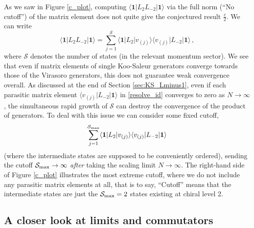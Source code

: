 \documentclass[a4paper,10pt]{article}
\newcommand{\linnea}[1]{$\framebox{\tiny L}$\ \textbf{\texttt{{\color{red}\footnotesize#1}}}}
\newcommand{\jesper}[1]{$\framebox{\tiny J}$\ \textbf{\texttt{{\color{cyan}\footnotesize#1}}}}
\begin{document}
As we saw in Figure \ref{c_plot}, computing $\langle \mathbf{1} | L_2L_{-2}|\mathbf{1}\rangle$ via the full norm (``No cutoff'') of the matrix element does not quite give the conjectured result $\frac{c}{2}$.   We can write
\begin{equation}\label{resolve_id}
\langle \mathbf{1} | L_{2}L_{-2} | \mathbf{1} \rangle =\sum_{j=1}^{\mathcal S} \langle \mathbf{1} | L_{2} | v_{(j)} \rangle\langle v_{(j)}|L_{-2} | \mathbf{1} \rangle \,,
\end{equation}
%
where ${\mathcal S}$ denotes the number of states (in the relevant momentum sector).
We see that even if matrix elements of single Koo-Saleur generators converge towards those of the Virasoro generators, this does not guarantee weak convergence overall. As discussed at the end of Section \ref{sec:KS_Lminus1}, even if each parasitic matrix element $\langle v_{(j)}|L_{-2} | \mathbf{1} \rangle$ in \eqref{resolve_id} converges to zero as $N\rightarrow\infty$, the simultaneous rapid growth of ${\mathcal S}$ can destroy the convergence of the product of generators. To deal with this issue we can consider some fixed cutoff,
%
\begin{equation}
\sum_{j=1}^{{\mathcal S}_{\rm max}} \langle \mathbf{1} | L_{2} | v_{(j)} \rangle\langle v_{(j)}|L_{-2} | \mathbf{1} \rangle
\end{equation}
%
(where the intermediate states are supposed to be conveniently ordered),
sending the cutoff ${\mathcal S}_{\rm max} \rightarrow\infty$ \emph{after} taking the scaling limit $N\rightarrow\infty$. The right-hand side of Figure \ref{c_plot} illustrates the most extreme cutoff, where we do not include any parasitic matrix elements at all, that is to say, ``Cutoff'' means that the intermediate states are just the ${\mathcal S}_{\rm max} = 2$ states existing at chiral level 2.

\subsection{A closer look at limits and commutators}\label{limits_section}
\end{document}
